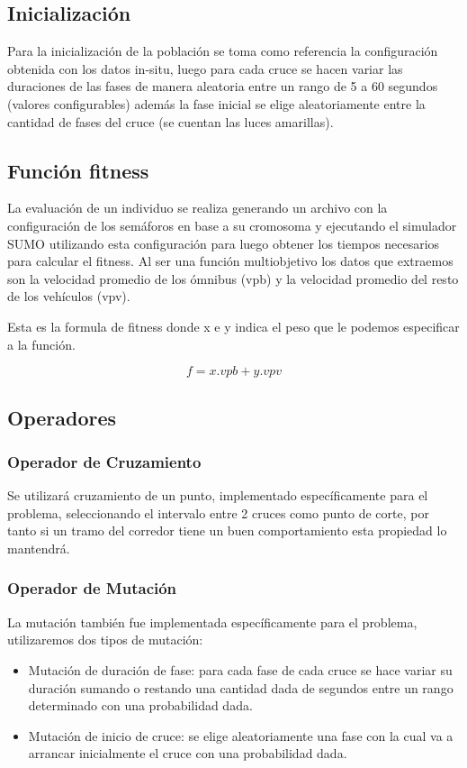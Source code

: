 \subsection{Inicialización}

Para la inicialización de la población se toma como referencia
la configuración obtenida con los datos in-situ, luego para cada
cruce se hacen variar las duraciones de las fases de manera aleatoria entre un rango de  5 a 60  segundos  (valores configurables)
además la fase inicial se elige aleatoriamente entre la cantidad de fases del cruce (se cuentan las luces amarillas).

\subsection{Función fitness}
La evaluación de un individuo se realiza generando un archivo con la configuración de los semáforos en base a su cromosoma y ejecutando el simulador SUMO utilizando esta configuración para luego obtener los tiempos necesarios para calcular el fitness.
Al ser una función multiobjetivo los datos que extraemos son la velocidad promedio de los ómnibus (vpb) y la velocidad promedio del resto de los vehículos (vpv).

Esta es la formula de fitness donde x e y indica el peso que le podemos especificar a la función.



        \begin{equation}
        \label{eq:funcion_fitness}
        f = x.vpb + y.vpv
        \end{equation}

\subsection{Operadores}
\subsubsection{Operador de Cruzamiento}
Se  utilizará cruzamiento  de  un  punto,  implementado
específicamente  para  el  problema,  seleccionando  el  intervalo
entre 2 cruces como punto de corte, por tanto si un tramo del corredor tiene un buen comportamiento esta propiedad lo mantendrá.


\subsubsection{Operador de Mutación}
La  mutación también fue  implementada  específicamente para
el problema, utilizaremos dos tipos de mutación:
\begin{itemize}

\item Mutación de duración de fase: para cada fase de cada cruce se
hace variar su duración sumando o restando una cantidad dada
de segundos entre un rango determinado con una probabilidad
dada.
\item Mutación de inicio de cruce: se elige aleatoriamente una fase
con  la  cual  va  a  arrancar  inicialmente  el  cruce  con  una
probabilidad dada.

\end{itemize}

